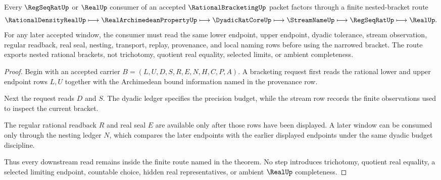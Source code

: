 \begin{theorem}
\label{thm:rational-bracketing-window-nesting}
Every $\RegSeqRatUp$ or $\RealUp$ consumer of an accepted $\RationalBracketingUp$ packet factors through a finite nested-bracket route
$$
\RationalDensityRealUp \longmapsto \RealArchimedeanPropertyUp \longmapsto \DyadicRatCoreUp \longmapsto \StreamNameUp \longmapsto \RegSeqRatUp \longmapsto \RealUp .
$$
For any later accepted window, the consumer must read the same lower endpoint, upper endpoint, dyadic tolerance, stream observation, regular readback, real seal, nesting, transport, replay, provenance, and local naming rows before using the narrowed bracket. The route exports nested rational brackets, not trichotomy, quotient real equality, selected limits, or ambient completeness.
\end{theorem}
\begin{proof}
Begin with an accepted carrier $B=(L,U,D,S,R,E,N,H,C,P,A)$. A bracketing request first reads the rational lower and upper endpoint rows $L,U$ together with the Archimedean bound information named in the provenance row.

Next the request reads $D$ and $S$. The dyadic ledger specifies the precision budget, while the stream row records the finite observations used to inspect the current bracket.

The regular rational readback $R$ and real seal $E$ are available only after those rows have been displayed. A later window can be consumed only through the nesting ledger $N$, which compares the later endpoints with the earlier displayed endpoints under the same dyadic budget discipline.

Thus every downstream read remains inside the finite route named in the theorem. No step introduces trichotomy, quotient real equality, a selected limiting endpoint, countable choice, hidden real representatives, or ambient $\RealUp$ completeness.
\end{proof}



